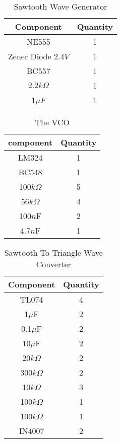 \begin{table}[H]
    \centering
    \begin{tabular}{|c|c|}
    \toprule
        Component & Quantity \\ \hline
         NE555 & 1  \\ 
         \hline
         Zener Diode $2.4V$ & 1 \\ 
         \hline
         BC557 & 1\\ 
         \hline
         $2.2k\Omega$ & 1\\ 
         \hline
         1$\mu F$ &  1\\
         \hline
    \end{tabular}
    \caption{Sawtooth Wave Generator}
\end{table}
\begin{table}[h]
    \centering
    \begin{tabular}{|c|c|}
    \hline
        component & Quantity \\ \hline
         LM324 & 1 \\ \hline
         BC548 & 1 \\ \hline
         100$k\Omega$ & 5 \\ \hline
         56$k\Omega$ & 4 \\ \hline
         100$n$F & 2 \\ \hline
         $4.7n$F & 1 \\ \hline
    \end{tabular}
    \caption{The VCO}
\end{table}
\begin{table}[h]
    \centering
    \begin{tabular}{|c|c|}
    \hline
         Component & Quantity \\ \hline  
         TL074 & 4 \\ \hline
         1$\mu$F & 2  \\ \hline
         0.1$\mu$F & 2  \\ \hline
         10$\mu$F & 2  \\ \hline
         20$k\Omega$ & 2 \\ \hline 
         300$k\Omega$ & 2 \\ \hline
         10$k\Omega$ & 3 \\ \hline
         100$k\Omega$ & 1 \\ \hline
         100$k\Omega$ & 1 \\ \hline
         IN4007 & 2 \\ \hline
         
    \end{tabular}
    \caption{Sawtooth To Triangle Wave Converter}
\end{table}